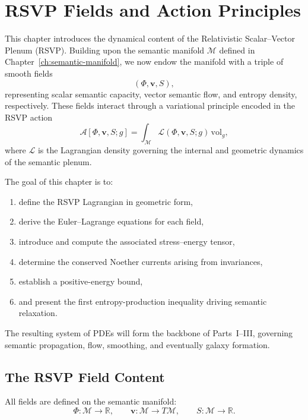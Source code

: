\chapter{RSVP Fields and Action Principles}
\label{ch:rsvp-fields}

This chapter introduces the dynamical content of the Relativistic Scalar--Vector Plenum (RSVP).  
Building upon the semantic manifold $\mathcal{M}$ defined in Chapter~\ref{ch:semantic-manifold}, we now endow the manifold with a triple of smooth fields
\[
(\Phi, \mathbf{v}, S),
\]
representing scalar semantic capacity, vector semantic flow, and entropy density, respectively.  
These fields interact through a variational principle encoded in the RSVP action
\[
\mathcal{A}[\Phi, \mathbf{v}, S; g]
  = \int_{\mathcal{M}} \mathcal{L}(\Phi, \mathbf{v}, S; g)\, \mathrm{vol}_g,
\]
where $\mathcal{L}$ is the Lagrangian density governing the internal and geometric dynamics of the semantic plenum.

The goal of this chapter is to:

\begin{enumerate}
\item define the RSVP Lagrangian in geometric form,
\item derive the Euler--Lagrange equations for each field,
\item introduce and compute the associated stress--energy tensor,
\item determine the conserved Noether currents arising from invariances,
\item establish a positive-energy bound,
\item and present the first entropy-production inequality driving semantic relaxation.
\end{enumerate}

The resulting system of PDEs will form the backbone of Parts~I--III, governing semantic propagation, flow, smoothing, and eventually galaxy formation.

\section{The RSVP Field Content}

All fields are defined on the semantic manifold:
\[
\Phi : \mathcal{M} \to \mathbb{R},
\qquad
\mathbf{v} : \mathcal{M} \to T\mathcal{M},
\qquad
S : \mathcal{M} \to \mathbb{R}.
\]

